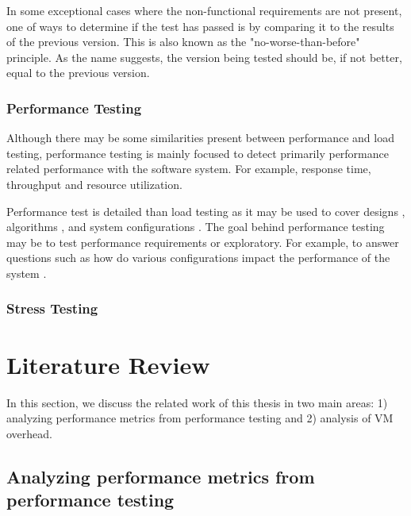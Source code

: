 In some exceptional cases where the non-functional requirements are not present, one of ways to determine if the test has passed is by comparing it to the results of the previous version. This is also known as the "no-worse-than-before" principle. As the name suggests, the version being tested should be, if not better, equal to the previous version. \cite{Dumke:2001}

\subsubsection{Performance Testing}

Although there may be some similarities present between performance and load testing, performance testing is mainly focused to detect primarily performance related performance with the software system. For example, response time, throughput and resource utilization. \cite{Barna:2011,6032540,Gorton}

Performance test is detailed than load testing as it may be used to cover designs \cite{csurgay1999performance,denaro2004early,denaro2005performance}, algorithms \cite{cangussu2009segment,cangussu2007reducing}, and system configurations \cite{hoskins2005software,pozin2011models,sopitkamol2005method}. The goal behind performance testing may be to test performance requirements \cite{pozin2011models} or exploratory. For example, to answer questions such as how do various configurations impact the performance of the system \cite{Menasce:2000,Menasce:1994,Menasce:2001,pozin2011models}.



\subsubsection{Stress Testing}

\section{Literature Review}

In this section, we discuss the related work of this thesis in two main areas: 1) analyzing performance metrics from performance testing and 2) analysis of VM overhead.


\subsection{Analyzing performance metrics from performance testing} 

